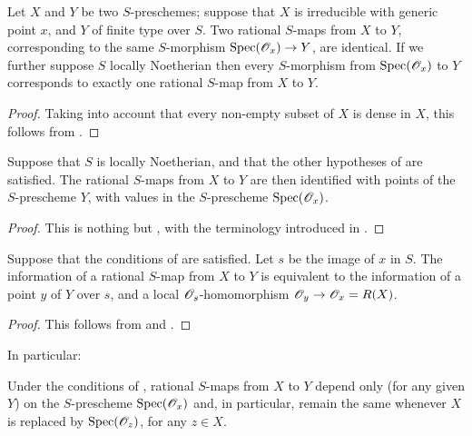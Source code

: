 \begin{prop}[7.1.11]
\label{1.7.1.11}
Let $X$ and $Y$ be two $S$-preschemes; suppose that $X$ is irreducible with generic point $x$, and $Y$ of finite type over $S$.
Two rational $S$-maps from $X$ to $Y$, corresponding to the same $S$-morphism ${\mathop{\mathrm{Spec}}\nolimits}(\mathscr{O}_x)\to Y$, are identical.
If we further suppose $S$ locally Noetherian then every $S$-morphism from ${\mathop{\mathrm{Spec}}\nolimits}(\mathscr{O}_x)$ to $Y$ corresponds to exactly one rational $S$-map from $X$ to $Y$.
\end{prop}

\begin{proof}
\label{proof-1.7.1.11}
Taking into account that every non-empty subset of $X$ is dense in $X$, this follows from .
\end{proof}

\begin{cor}[7.1.12]
\label{1.7.1.12}
Suppose that $S$ is locally Noetherian, and that the other hypotheses of  are satisfied.
The rational $S$-maps from $X$ to $Y$ are then identified with points of the $S$-prescheme $Y$, with values in the $S$-prescheme ${\mathop{\mathrm{Spec}}\nolimits}(\mathscr{O}_x)$.
\end{cor}

\begin{proof}
\label{proof-1.7.1.12}
This is nothing but , with the terminology introduced in .
\end{proof}

\begin{cor}[7.1.13]
\label{1.7.1.13}
Suppose that the conditions of  are satisfied.
Let $s$ be the image of $x$ in $S$.
The information of a rational $S$-map from $X$ to $Y$ is equivalent to the information of a point $y$ of $Y$ over $s$, and a local $\mathscr{O}_s$-homomorphism $\mathscr{O}_y\to\mathscr{O}_x=R(X)$.
\end{cor}

\begin{proof}
\label{proof-1.7.1.13}
This follows from  and .
\end{proof}

In particular:
\begin{cor}[7.1.14]
\label{1.7.1.14}
Under the conditions of , rational $S$-maps from $X$ to $Y$ depend only (for any given $Y$) on the $S$-prescheme ${\mathop{\mathrm{Spec}}\nolimits}(\mathscr{O}_x)$ and, in particular, remain the same whenever $X$ is replaced by ${\mathop{\mathrm{Spec}}\nolimits}(\mathscr{O}_z)$, for any $z\in X$.
\end{cor}

